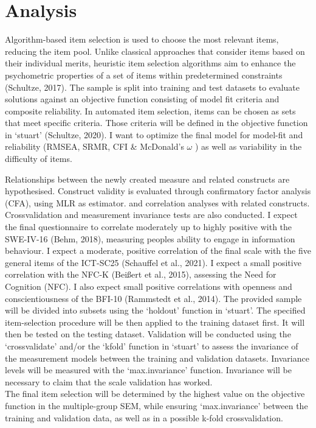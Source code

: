\documentclass[
  12pt,
  a4paper,
  twoside]{article}
\begin{document}
\section{Analysis}\label{analysis}

Algorithm-based item selection is used to choose the most relevant
items, reducing the item pool. Unlike classical approaches that consider
items based on their individual merits, heuristic item selection
algorithms aim to enhance the psychometric properties of a set of items
within predetermined constraints (Schultze, 2017). The sample is split
into training and test datasets to evaluate solutions against an
objective function consisting of model fit criteria and composite
reliability. In automated item selection, items can be chosen as sets
that meet specific criteria. Those criteria will be defined in the
objective function in `stuart' (Schultze, 2020). I want to optimize the
final model for model-fit and reliability (RMSEA, SRMR, CFI \&
McDonald's \(\omega\) ) as well as variability in the difficulty of
items.

Relationships between the newly created measure and related constructs
are hypothesised. Construct validity is evaluated through confirmatory
factor analysis (CFA), using MLR as estimator. and correlation analyses
with related constructs. Crossvalidation and measurement invariance
tests are also conducted. I expect the final questionnaire to correlate
moderately up to highly positive with the SWE-IV-16 (Behm, 2018),
measuring peoples ability to engage in information behaviour. I expect a
moderate, positive correlation of the final scale with the five general
items of the ICT-SC25 (Schauffel et al., 2021). I expect a small
positive correlation with the NFC-K (Beißert et al., 2015), assessing
the Need for Cognition (NFC). I also expect small positive correlations
with openness and conscientiousness of the BFI-10 (Rammstedt et al.,
2014). The provided sample will be divided into subsets using the
`holdout' function in `stuart'. The specified item-selection procedure
will be then applied to the training dataset first. It will then be
tested on the testing dataset. Validation will be conducted using the
`crossvalidate' and/or the `kfold' function in `stuart' to assess the
invariance of the measurement models between the training and validation
datasets. Invariance levels will be measured with the `max.invariance'
function. Invariance will be necessary to claim that the scale
validation has worked.\\
The final item selection will be determined by the highest value on the
objective function in the multiple-group SEM, while ensuring
`max.invariance' between the training and validation data, as well as in
a possible k-fold crossvalidation.
\end{document}

